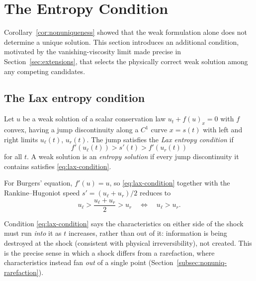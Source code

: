 \section{The Entropy Condition}
\label{sec:entropy-condition}

Corollary~\ref{cor:nonuniqueness} showed that the weak formulation alone
does not determine a unique solution. This section introduces an
additional condition, motivated by the vanishing-viscosity limit made
precise in Section~\ref{sec:extensions}, that selects the physically
correct weak solution among any competing candidates.

\subsection{The Lax entropy condition}
\label{subsec:lax-condition}

\begin{definition}
\label{def:lax-entropy}
Let $u$ be a weak solution of a scalar conservation law $u_t+f(u)_x=0$
with $f$ convex, having a jump discontinuity along a $C^1$ curve $x=s(t)$
with left and right limits $u_\ell(t)$, $u_r(t)$. The jump satisfies the
\emph{Lax entropy condition} if
\begin{equation}
  \label{eq:lax-condition}
  f'(u_\ell(t)) > s'(t) > f'(u_r(t))
\end{equation}
for all $t$. A weak solution is an \emph{entropy solution} if every jump
discontinuity it contains satisfies \eqref{eq:lax-condition}.
\end{definition}

For Burgers' equation, $f'(u)=u$, so \eqref{eq:lax-condition} together
with the Rankine--Hugoniot speed $s'=(u_\ell+u_r)/2$ reduces to
\begin{equation}
  \label{eq:lax-burgers}
  u_\ell > \frac{u_\ell+u_r}{2} > u_r
  \quad \Longleftrightarrow \quad
  u_\ell > u_r.
\end{equation}

\begin{remark}
Condition \eqref{eq:lax-condition} says the characteristics on either side
of the shock must run \emph{into} it as $t$ increases, rather than out of
it: information is being destroyed at the shock (consistent with physical
irreversibility), not created. This is the precise sense in which a shock
differs from a rarefaction, where characteristics instead fan \emph{out}
of a single point (Section~\ref{subsec:nonuniq-rarefaction}).
\end{remark}

